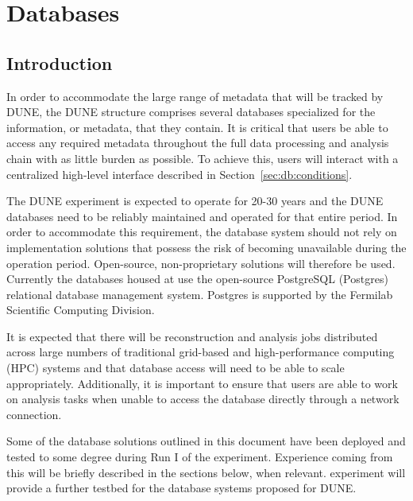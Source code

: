 \documentclass[../main-v1.tex]{subfiles}
\begin{document}
\chapter{Databases }
\label{ch:db}

\section{Introduction   }
\label{sec:db:intro} 

In order to accommodate the large range of metadata that will be tracked by DUNE, the DUNE  structure comprises several databases specialized for the information, or metadata, that they contain. It is critical that users be able to access any required metadata throughout the full data processing and analysis chain with as little burden as possible. To achieve this, users will interact with a centralized high-level interface   described in Section~\ref{sec:db:conditions}.

The DUNE experiment is expected to operate for 20-30 years and the DUNE databases need to be reliably maintained and operated for that entire period. In order to accommodate this requirement, the database system should not rely on implementation solutions that possess the risk of becoming unavailable during the operation period. Open-source, non-proprietary solutions will therefore be used. Currently the databases housed at  use the open-source PostgreSQL (Postgres) relational database management system. Postgres is supported by the Fermilab Scientific Computing Division.       

It is expected that there will be reconstruction and analysis jobs distributed across large numbers of traditional grid-based and high-performance computing (HPC) systems and that database access will need to be able to scale appropriately. Additionally, it is important to ensure that users are able to work on analysis tasks when unable to access the database directly through a network connection. 

Some of the database solutions outlined in this document have been deployed and tested to some degree during Run I of the  experiment. Experience coming from %
this will be briefly described in the sections below, when relevant. %
 experiment will provide a further testbed for the database systems proposed for DUNE.  
\end{document}
